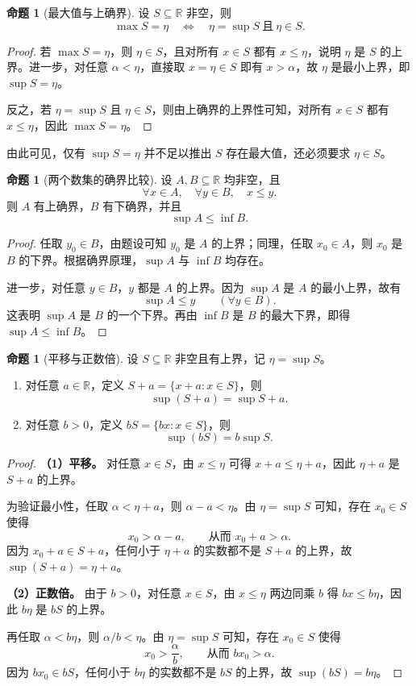 \documentclass[UTF8, fontset=fandol, a4paper, 12pt]{ctexart}
\newcommand{\R}{\mathbb{R}}
\theoremstyle{definition}
\newtheorem{proposition}[definition]{命题}
\begin{document}
\begin{proposition}[最大值与上确界]
设 $S\subseteq\R$ 非空，则
\[
  \max S=\eta
  \quad\Longleftrightarrow\quad
  \eta=\sup S\ \text{且}\ \eta\in S.
\]
\end{proposition}
\begin{proof}
若 $\max S=\eta$，则 $\eta\in S$，且对所有 $x\in S$ 都有 $x\le\eta$，说明 $\eta$ 是 $S$ 的上界。进一步，对任意 $\alpha<\eta$，直接取 $x=\eta\in S$ 即有 $x>\alpha$，故 $\eta$ 是最小上界，即 $\sup S=\eta$。

反之，若 $\eta=\sup S$ 且 $\eta\in S$，则由上确界的上界性可知，对所有 $x\in S$ 都有 $x\le\eta$，因此 $\max S=\eta$。
\end{proof}

\noindent 由此可见，仅有 $\sup S=\eta$ 并不足以推出 $S$ 存在最大值，还必须要求 $\eta\in S$。

\begin{proposition}[两个数集的确界比较]
设 $A,B\subseteq\R$ 均非空，且
\[
  \forall x\in A,\quad\forall y\in B,\quad x\le y.
\]
则 $A$ 有上确界，$B$ 有下确界，并且
\[
  \sup A\le\inf B.
\]
\end{proposition}
\begin{proof}
任取 $y_0\in B$，由题设可知 $y_0$ 是 $A$ 的上界；同理，任取 $x_0\in A$，则 $x_0$ 是 $B$ 的下界。根据确界原理，$\sup A$ 与 $\inf B$ 均存在。

进一步，对任意 $y\in B$，$y$ 都是 $A$ 的上界。因为 $\sup A$ 是 $A$ 的最小上界，故有
\[
  \sup A\le y\qquad(\forall y\in B).
\]
这表明 $\sup A$ 是 $B$ 的一个下界。再由 $\inf B$ 是 $B$ 的最大下界，即得 $\sup A\le\inf B$。
\end{proof}

\begin{proposition}[平移与正数倍]
设 $S\subseteq\R$ 非空且有上界，记 $\eta=\sup S$。
\begin{enumerate}
  \item 对任意 $a\in\R$，定义 $S+a=\{x+a:x\in S\}$，则
  \[
    \sup(S+a)=\sup S+a.
  \]
  \item 对任意 $b>0$，定义 $bS=\{bx:x\in S\}$，则
  \[
    \sup(bS)=b\sup S.
  \]
\end{enumerate}
\end{proposition}
\begin{proof}
\textbf{（1）平移。}
对任意 $x\in S$，由 $x\le\eta$ 可得 $x+a\le\eta+a$，因此 $\eta+a$ 是 $S+a$ 的上界。

为验证最小性，任取 $\alpha<\eta+a$，则 $\alpha-a<\eta$。由 $\eta=\sup S$ 可知，存在 $x_0\in S$ 使得
\[
  x_0>\alpha-a,
  \qquad \text{从而 }x_0+a>\alpha.
\]
因为 $x_0+a\in S+a$，任何小于 $\eta+a$ 的实数都不是 $S+a$ 的上界，故 $\sup(S+a)=\eta+a$。

\medskip
\textbf{（2）正数倍。}
由于 $b>0$，对任意 $x\in S$，由 $x\le\eta$ 两边同乘 $b$ 得 $bx\le b\eta$，因此 $b\eta$ 是 $bS$ 的上界。

再任取 $\alpha<b\eta$，则 $\alpha/b<\eta$。由 $\eta=\sup S$ 可知，存在 $x_0\in S$ 使得
\[
  x_0>\frac\alpha b,
  \qquad \text{从而 }bx_0>\alpha.
\]
因为 $bx_0\in bS$，任何小于 $b\eta$ 的实数都不是 $bS$ 的上界，故 $\sup(bS)=b\eta$。
\end{proof}
\end{document}
